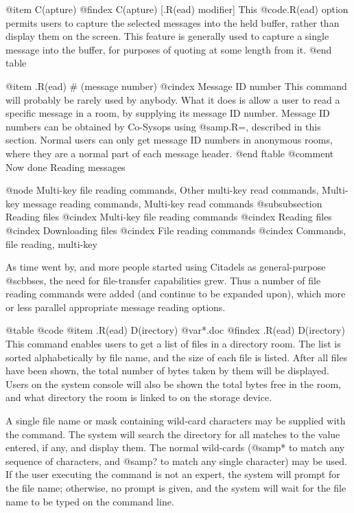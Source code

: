 @item C(apture)
@findex C(apture) [.R(ead) modifier]
This @code{.R(ead)} option permits users to capture the
selected messages into the held buffer, rather than display
them on the screen.  This feature is generally used to capture
a single message into the buffer, for purposes of quoting at
some length from it.
@end table

@item .R(ead) # (message number)
@cindex Message ID number
This command will probably be rarely used by anybody.  What it does is
allow a user to read a specific message in a room, by supplying its
message ID number.  Message ID numbers can be obtained by Co-Sysops
using @samp{.R=}, described in this section.  Normal users can only
get message ID numbers in anonymous rooms, where they are a normal part
of each message header.
@end ftable
@comment Now done Reading messages

@node Multi-key file reading commands, Other multi-key read commands, Multi-key message reading commands, Multi-key read commands
@subsubsection Reading files
@cindex Multi-key file reading commands
@cindex Reading files
@cindex Downloading files
@cindex File reading commands
@cindex Commands, file reading, multi-key

As time went by, and more people started using Citadels as general-purpose
@sc{bbs}es, the need for file-transfer capabilities grew.  Thus a number of
file reading commands were added (and continue to be expanded upon), which
more or less parallel appropriate message reading options.

@table @code
@item .R(ead) D(irectory) @var{*.doc}
@findex .R(ead) D(irectory)
This command enables users to get a list of files in a
directory room.  The list is sorted alphabetically by file name, and
the size of each file is listed.  After all files have been shown, the
total number of bytes taken by them will be displayed.  Users on the
system console will also be shown the total bytes free in the room,
and what directory the room is linked to on the storage device.

A single file name or mask containing wild-card characters
may be supplied with the command.  The system will search the directory
for all matches to the value entered, if any, and display them.  The
normal wild-cards (@samp{*} to match any sequence of characters, and @samp{?} to
match any single character) may be used.  If the user executing the
command is not an expert, the system will prompt for the file name;
otherwise, no prompt is given, and the system will wait for the file
name to be typed on the command line.


